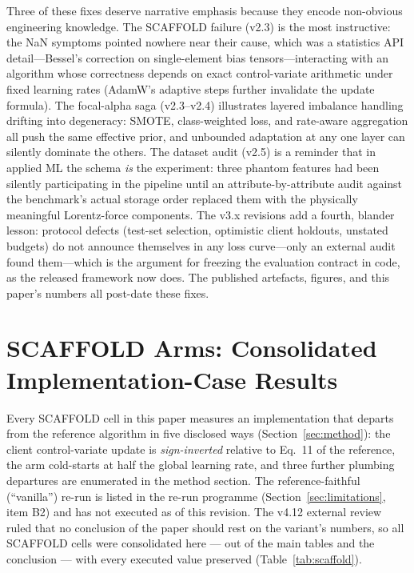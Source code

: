 Three of these fixes deserve narrative emphasis because they encode
non-obvious engineering knowledge. The SCAFFOLD failure (v2.3) is the
most instructive: the NaN symptoms pointed nowhere near their cause,
which was a statistics API detail---Bessel's correction on
single-element bias tensors---interacting with an algorithm whose
correctness depends on exact control-variate arithmetic under fixed
learning rates (AdamW's adaptive steps further invalidate the update
formula). The focal-alpha saga (v2.3--v2.4) illustrates layered
imbalance handling drifting into degeneracy: SMOTE, class-weighted
loss, and rate-aware aggregation all push the same effective prior,
and unbounded adaptation at any one layer can silently dominate the
others. The dataset audit (v2.5) is a reminder that in applied ML the
schema \emph{is} the experiment: three phantom features had been
silently participating in the pipeline until an attribute-by-attribute
audit against the benchmark's actual storage order replaced them with
the physically meaningful Lorentz-force components. The v3.x
revisions add a fourth, blander lesson: protocol defects
(test-set selection, optimistic client holdouts, unstated budgets)
do not announce themselves in any loss curve---only an external audit
found them---which is the argument for freezing the evaluation
contract in code, as the released framework now does. The published
artefacts, figures, and this paper's numbers all post-date these
fixes.

\section{SCAFFOLD Arms: Consolidated Implementation-Case Results}
\label{sec:app-scaffold}

Every SCAFFOLD cell in this paper measures an implementation that
departs from the reference algorithm in five disclosed ways
(Section~\ref{sec:method}): the client control-variate update is
\emph{sign-inverted} relative to Eq.~11 of the reference, the arm
cold-starts at half the global learning rate, and three further
plumbing departures are enumerated in the method section. The
reference-faithful (``vanilla'') re-run is listed in the re-run
programme (Section~\ref{sec:limitations}, item B2) and has not
executed as of this revision. The v4.12 external review ruled that
no conclusion of the paper should rest on the variant's numbers, so
all SCAFFOLD cells were consolidated here --- out of the main tables
and the conclusion --- with every executed value preserved
(Table~\ref{tab:scaffold}).

